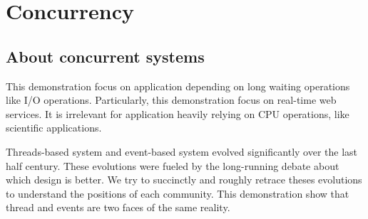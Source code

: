 \section{Concurrency}
















\subsection{About concurrent systems}

This demonstration focus on application depending on long waiting operations like I/O operations.
Particularly, this demonstration focus on real-time web services.
It is irrelevant for application heavily relying on CPU operations, like scientific applications.

Threads-based system and event-based system evolved significantly over the last half century.
These evolutions were fueled by the long-running debate about which design is better.
We try to succinctly and roughly retrace theses evolutions to understand the positions of each community.
This demonstration show that thread and events are two faces of the same reality.


